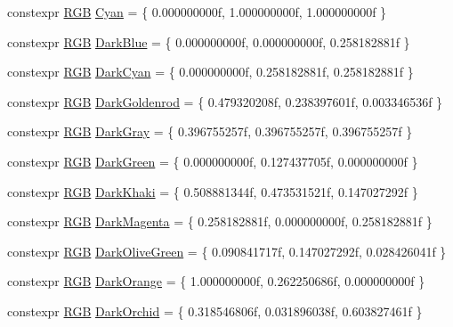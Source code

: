 \begin{DoxyCompactItemize}
\item 
constexpr \mbox{\hyperlink{structmage_1_1_r_g_b}{R\+GB}} \mbox{\hyperlink{namespacemage_1_1color_a2b9093d5d06a4a0421cb602c22deadb5}{Cyan}} = \{ 0.\+000000000f, 1.\+000000000f, 1.\+000000000f \}
\item 
constexpr \mbox{\hyperlink{structmage_1_1_r_g_b}{R\+GB}} \mbox{\hyperlink{namespacemage_1_1color_abdd3f39d1060d9d691eba6726b5455cc}{Dark\+Blue}} = \{ 0.\+000000000f, 0.\+000000000f, 0.\+258182881f \}
\item 
constexpr \mbox{\hyperlink{structmage_1_1_r_g_b}{R\+GB}} \mbox{\hyperlink{namespacemage_1_1color_a69f91a91d64036b98384c4d312c848ea}{Dark\+Cyan}} = \{ 0.\+000000000f, 0.\+258182881f, 0.\+258182881f \}
\item 
constexpr \mbox{\hyperlink{structmage_1_1_r_g_b}{R\+GB}} \mbox{\hyperlink{namespacemage_1_1color_a50ec8ddc7d55e5286b0b2f01ab690b2b}{Dark\+Goldenrod}} = \{ 0.\+479320208f, 0.\+238397601f, 0.\+003346536f \}
\item 
constexpr \mbox{\hyperlink{structmage_1_1_r_g_b}{R\+GB}} \mbox{\hyperlink{namespacemage_1_1color_abe66674f72bdb34922b39b4ed1892159}{Dark\+Gray}} = \{ 0.\+396755257f, 0.\+396755257f, 0.\+396755257f \}
\item 
constexpr \mbox{\hyperlink{structmage_1_1_r_g_b}{R\+GB}} \mbox{\hyperlink{namespacemage_1_1color_a810f271efcbd9574bec9076a18c30476}{Dark\+Green}} = \{ 0.\+000000000f, 0.\+127437705f, 0.\+000000000f \}
\item 
constexpr \mbox{\hyperlink{structmage_1_1_r_g_b}{R\+GB}} \mbox{\hyperlink{namespacemage_1_1color_a1673eb9031256e1ba8f8438168803eef}{Dark\+Khaki}} = \{ 0.\+508881344f, 0.\+473531521f, 0.\+147027292f \}
\item 
constexpr \mbox{\hyperlink{structmage_1_1_r_g_b}{R\+GB}} \mbox{\hyperlink{namespacemage_1_1color_a6a72bd256475a691285a9ac994d95361}{Dark\+Magenta}} = \{ 0.\+258182881f, 0.\+000000000f, 0.\+258182881f \}
\item 
constexpr \mbox{\hyperlink{structmage_1_1_r_g_b}{R\+GB}} \mbox{\hyperlink{namespacemage_1_1color_adb31ce54111ec7b2643ee262367b60a3}{Dark\+Olive\+Green}} = \{ 0.\+090841717f, 0.\+147027292f, 0.\+028426041f \}
\item 
constexpr \mbox{\hyperlink{structmage_1_1_r_g_b}{R\+GB}} \mbox{\hyperlink{namespacemage_1_1color_ab204ba538e4ca171b5ae250023e334b0}{Dark\+Orange}} = \{ 1.\+000000000f, 0.\+262250686f, 0.\+000000000f \}
\item 
constexpr \mbox{\hyperlink{structmage_1_1_r_g_b}{R\+GB}} \mbox{\hyperlink{namespacemage_1_1color_ae1054dbb15cd00a4ffb9c5644d8e2319}{Dark\+Orchid}} = \{ 0.\+318546806f, 0.\+031896038f, 0.\+603827461f \}

\end{DoxyCompactItemize}
